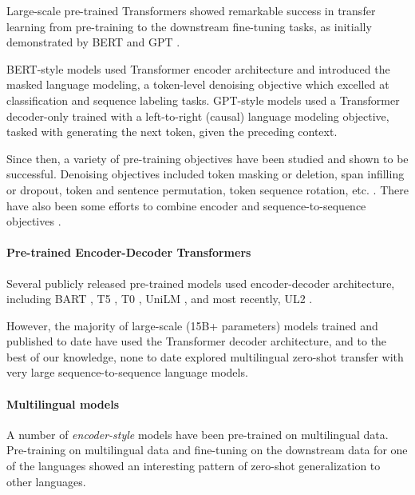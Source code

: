 Large-scale pre-trained Transformers showed remarkable success in transfer learning from pre-training to the downstream fine-tuning tasks, as initially demonstrated by BERT \citep{devlin-etal-2019-bert} and GPT \citep{Radford2018ImprovingLU,Radford2019LanguageMA,Brown2020LanguageMA}. 

BERT-style models used Transformer encoder architecture and introduced the masked language modeling, a token-level denoising objective which excelled at classification and sequence labeling tasks. GPT-style models used a Transformer decoder-only trained with a left-to-right (causal) language modeling objective, tasked with generating the next token, given the preceding context.

Since then, a variety of pre-training objectives have been studied and shown to be successful. Denoising objectives included token masking or deletion, span infilling or dropout, token and sentence permutation, token sequence rotation, etc. \citep{Lewis2020BARTDS,Raffel2020ExploringTL,song2019mass}. There have also been some efforts to combine encoder and sequence-to-sequence objectives \citep{Dong2019UnifiedLM,Bao2020UniLMv2PL}.

\paragraph{Pre-trained Encoder-Decoder Transformers}

Several publicly released pre-trained models used encoder-decoder architecture, including BART \citep{Lewis2020BARTDS}, T5 \citep{Raffel2020ExploringTL}, T0 \citep{Sanh2021MultitaskPT}, UniLM \citep{Dong2019UnifiedLM,Bao2020UniLMv2PL}, and most recently, UL2 \citep{Tay2022UnifyingLL}.

However, the majority of large-scale (15B+ parameters) models trained and published to date have used the Transformer decoder architecture, and to the best of our knowledge, none to date explored multilingual zero-shot transfer with very large sequence-to-sequence language models.

\paragraph{Multilingual models}

A number of \textit{encoder-style} models have been pre-trained on multilingual data. Pre-training on multilingual data and fine-tuning on the downstream data for one of the languages showed an interesting pattern of zero-shot generalization to other languages.  

